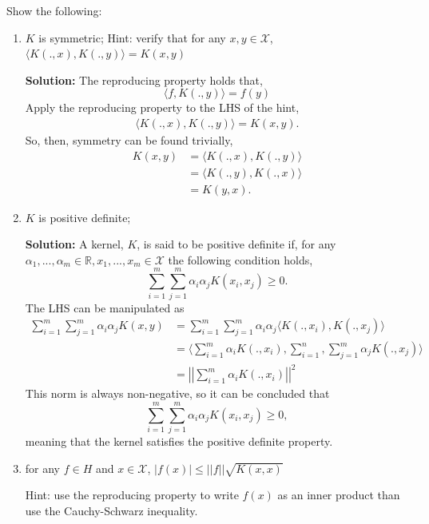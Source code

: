 \documentclass{article}[12pt]
\begin{document}
Show the following: 
\begin{enumerate}
\item $K$ is symmetric;
Hint: verify that for any $x,y \in \mathcal{X}$, $\langle K(.,x), K(.,y) \rangle = K(x,y)$

\textbf{Solution:} The reproducing property holds that, 
\begin{equation}
	\langle f, K(., y) \rangle = f(y)
\end{equation}
Apply the reproducing property to the LHS of the hint,
\begin{equation}
	\begin{aligned}
		\langle K(.,x), K(., y) \rangle = K(x, y).
	\end{aligned}
\end{equation}
So, then, symmetry can be found trivially,
\begin{equation}
	\begin{aligned}
		K(x, y) &= \langle K(., x), K(., y) \rangle \\
			&= \langle K(., y), K(., x) \rangle \\
			&= K(y, x).
	\end{aligned}
\end{equation}

\item $K$ is positive definite; 

\textbf{Solution:} A kernel, $K$, is said to be positive definite if, for any $\alpha_1, ..., \alpha_m \in \mathbb R, x_1, ..., x_m \in \mathcal X$ the following condition holds,
\begin{equation}
	\sum^{m}_{i=1} \sum^{m}_{j=1} \alpha_i \alpha_j K(x_i, x_j) \ge 0. 
\end{equation}
The LHS can be manipulated as 
\begin{equation}
	\begin{aligned}
		\sum^{m}_{i=1} \sum^{m}_{j=1} \alpha_i \alpha_j K(x, y)  &= \sum^{m}_{i=1} \sum^{m}_{j=1} \alpha_i \alpha_j \langle K(., x_i), K(., x_j) \rangle \\    
									 &=  \langle \sum^{m}_{i=1} \alpha_i K(., x_i), \sum^{n}_{i=1}, \sum^{m}_{j=1} \alpha_j K(., x_j)    \rangle \\
									 &= \left| \left| \sum^{m}_{i=1} \alpha_i K(., x_i)  \right| \right|^2
	\end{aligned}
\end{equation}
This norm is always non-negative, so it can be concluded that
\begin{equation}
	\sum^{m}_{i=1} \sum^{m}_{j=1} \alpha_i \alpha_j K(x_i, x_j) \ge 0, 
\end{equation}
meaning that the kernel satisfies the positive definite property.



\item for any $f \in H$ and $x \in \mathcal{X}$, $|f(x)|\leq ||f||\sqrt{K(x,x)}$

Hint: use the reproducing property to write $f(x)$ as an inner product than use the Cauchy-Schwarz inequality. 
\end{enumerate}
\end{document}
